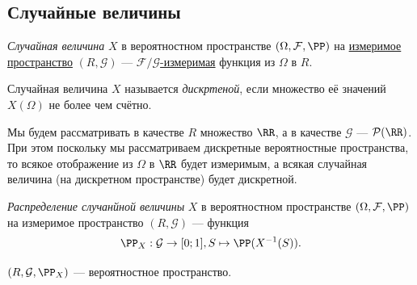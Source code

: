 \documentclass[12pt,a4paper]{article}
\begin{document}
    \subsection{Случайные величины}

    \begin{definition}
        \emph{Случайная величина} $X$ в вероятностном пространстве $(\Omega, \mathcal{F}, \PP)$ на \href{https://ru.wikipedia.org/wiki/\%D0\%98\%D0\%B7\%D0\%BC\%D0\%B5\%D1\%80\%D0\%B8\%D0\%BC\%D0\%BE\%D0\%B5_\%D0\%BF\%D1\%80\%D0\%BE\%D1\%81\%D1\%82\%D1\%80\%D0\%B0\%D0\%BD\%D1\%81\%D1\%82\%D0\%B2\%D0\%BE}{измеримое пространство} $(R, \mathcal{G})$ --- \href{https://ru.wikipedia.org/wiki/\%D0\%98\%D0\%B7\%D0\%BC\%D0\%B5\%D1\%80\%D0\%B8\%D0\%BC\%D0\%B0\%D1\%8F_\%D1\%84\%D1\%83\%D0\%BD\%D0\%BA\%D1\%86\%D0\%B8\%D1\%8F}{$\mathcal{F}/\mathcal{G}$-измеримая} функция из $\Omega$ в $R$.
    \end{definition}

    \begin{definition}
        Случайная величина $X$ называется \emph{дискртеной}, если множество её значений $X(\Omega)$ не более чем счётно.
    \end{definition}

    \begin{remark*}
        Мы будем рассматривать в качестве $R$ множество $\RR$, а в качестве $\mathcal{G}$ --- $\mathcal{P}(\RR)$. При этом поскольку мы рассматриваем дискретные вероятностные пространства, то всякое отображение из $\Omega$ в $\RR$ будет измеримым, а всякая случайная величина (на дискретном пространстве) будет дискретной.
    \end{remark*}

    \begin{definition}
        \emph{Распределение случанйной величины} $X$ в вероятностном пространстве $(\Omega, \mathcal{F}, \PP)$ на измеримое пространство $(R, \mathcal{G})$ --- функция
        \[\PP_X: \mathcal{G} \to [0; 1], S \mapsto \PP(X^{-1}(S)).\]
    \end{definition}

    \begin{remark}
        $(R, \mathcal{G}, \PP_X)$ --- вероятностное пространство.
    \end{remark}
\end{document}
